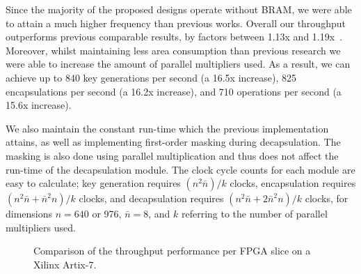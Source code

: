 Since the majority of the proposed designs operate without BRAM, we were able to attain a much higher frequency than previous works. Overall our throughput outperforms previous comparable results, by factors between 1.13x and 1.19x~\cite{howe2018standard}. Moreover, whilst maintaining less area consumption than previous research we were able to increase the amount of parallel multipliers used. As a result, we can achieve up to 840 key generations per second (a 16.5x increase), 825 encapsulations per second (a 16.2x increase), and 710 operations per second (a 15.6x increase).

We also maintain the constant run-time which the previous implementation attains, as well as implementing first-order masking during decapsulation. The masking is also done using parallel multiplication and thus does not affect the run-time of the decapsulation module. The clock cycle counts for each module are easy to calculate; key generation requires $ (n^2\bar{n}) / k$ clocks, encapsulation requires $ (n^2\bar{n} + \bar{n}^2n)/k $ clocks, and decapsulation requires $(n^2\bar{n} + 2\bar{n}^2n)/k$ clocks, for dimensions $n=640$ or 976, $\bar{n}=8$, and $k$ referring to the number of parallel multipliers used.

\begin{figure}[h]
\centering
    \advance\leftskip-1cm
\resizebox{0.75\textwidth}{!}{%
}
\caption{Comparison of the throughput performance per FPGA slice on a Xilinx Artix-7.}
 \label{fig:hw_line}
\end{figure}